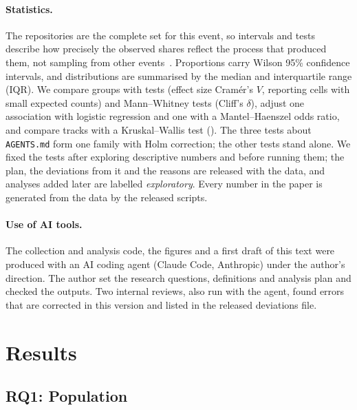 \documentclass{article}
\begin{document}
\paragraph{Statistics.}
The repositories are the complete set for this event, so intervals and tests describe how precisely the observed shares reflect the process that produced them, not sampling from other events~\cite{baltes2022sampling}. Proportions carry Wilson 95\% confidence intervals, and distributions are summarised by the median and interquartile range (IQR). We compare groups with \chisq{} tests (effect size Cramér's $V$, reporting cells with small expected counts) and Mann--Whitney tests (Cliff's $\delta$), adjust one association with logistic regression and one with a Mantel--Haenszel odds ratio, and compare tracks with a Kruskal--Wallis test (\epsq). The three tests about \texttt{AGENTS.md} form one family with Holm correction; the other tests stand alone. We fixed the tests after exploring descriptive numbers and before running them; the plan, the deviations from it and the reasons are released with the data, and analyses added later are labelled \emph{exploratory}. Every number in the paper is generated from the data by the released scripts.

\paragraph{Use of AI tools.}
The collection and analysis code, the figures and a first draft of this text were produced with an AI coding agent (Claude Code, Anthropic) under the author's direction. The author set the research questions, definitions and analysis plan and checked the outputs. Two internal reviews, also run with the agent, found errors that are corrected in this version and listed in the released deviations file. 

\section{Results}\label{sec:results}

\subsection{RQ1: Population}\label{sec:rq1}
\end{document}
